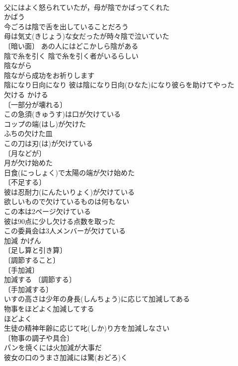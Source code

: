 \documentclass[8pt]{extreport}
\begin{document}
\begin{CJK}{UTF8}{min}
\\	父にはよく怒られていたが，母が陰でかばってくれた 
\\	かばう　
\\	今ごろは陰で舌を出していることだろう 
\\	母は気丈(きじょう)な女だったが時々陰で泣いていた 
\\	〔暗い面〕 あの人にはどこかしら陰がある 
\\	陰で糸を引く 陰で糸を引く者がいるらしい 
\\	陰ながら 
\\	陰ながら成功をお祈りします 
\\	陰になり日向になり 彼は陰になり日向(ひなた)になり彼らを助けてやった 
\\	欠ける	かける	
\\	〔一部分が壊れる〕
\\	この急須(きゅうす)は口が欠けている 
\\	コップの端(はし)が欠けた 
\\	ふちの欠けた皿 
\\	この刀は刃(は)が欠けている 
\\	〔月などが〕
\\	月が欠け始めた 
\\	日食(にっしょく)で太陽の端が欠け始めた 
\\	〔不足する〕
\\	彼は忍耐力(にんたいりょく)が欠けている 
\\	欲しいもので欠けているものは何もない 
\\	この本は2ページ欠けている 
\\	彼は90点に少し欠ける点数を取った 
\\	この委員会は3人メンバーが欠けている 
\\	加減	かげん	
\\	〔足し算と引き算〕
\\	〔調節すること〕
\\	〔手加減〕
\\	加減する 〔調節する〕
\\	〔手加減する〕
\\	いすの高さは少年の身長(しんちょう)に応じて加減してある 
\\	物事をほどよく加減してする 
\\	ほどよく 
\\	生徒の精神年齢に応じて叱(しか)り方を加減しなさい 
\\	〔物事の調子や具合〕 
\\	パンを焼くには火加減が大事だ 
\\	彼女の口のうまさ加減には驚(おどろ)く 

\end{CJK}
\end{document}
